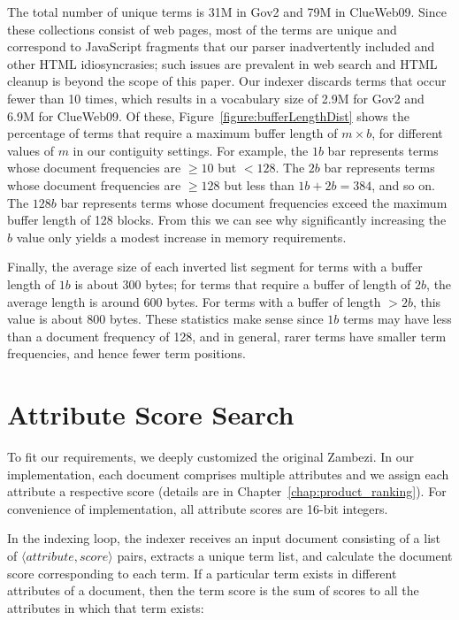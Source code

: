 The total number of unique terms is 31M in Gov2 and 79M in ClueWeb09. Since these collections consist of web pages, most of the terms are unique and correspond to JavaScript fragments that our parser inadvertently included and other HTML idiosyncrasies; such issues are prevalent in web search and HTML cleanup is beyond the scope of this paper. Our indexer discards terms that occur fewer than 10 times, which results in a vocabulary size of 2.9M for Gov2 and 6.9M for ClueWeb09. Of these, Figure~\ref{figure:bufferLengthDist} shows the percentage of terms that require a maximum buffer length of $m \times b$, for different values of $m$ in our contiguity settings. For example, the $1b$ bar represents terms whose document frequencies are $\ge10$ but $<128$. The $2b$ bar represents terms whose document frequencies are $\ge128$ but less than $1b + 2b = 384$, and so on. The $128b$ bar represents terms whose document frequencies exceed the maximum buffer length of 128 blocks. From this we can see why significantly 
increasing the $b$ value only yields a modest increase in memory requirements.

Finally, the average size of each inverted list segment for terms with a buffer length of $1b$ is about 300 bytes; for terms that require a buffer of length of $2b$, the average length is around 600 bytes. For terms with a buffer of length $>2b$, this value is about 800 bytes. These statistics make sense since $1b$ terms may have less than a document frequency of 128, and in general, rarer terms have smaller term frequencies, and hence fewer term positions.

\section{Attribute Score Search}

To fit our requirements, we deeply customized the original Zambezi. In our implementation, each document comprises multiple attributes and we assign each attribute a respective score (details are in Chapter~\ref{chap:product_ranking}). For convenience of implementation, all attribute scores are 16-bit integers.

In the indexing loop, the indexer receives an input document consisting of a list of \(\langle attribute, score \rangle\) pairs, extracts a unique term list, and calculate the document score corresponding to each term. If a particular term exists in different attributes of a document, then the term score is the sum of scores to all the attributes in which that term exists:

